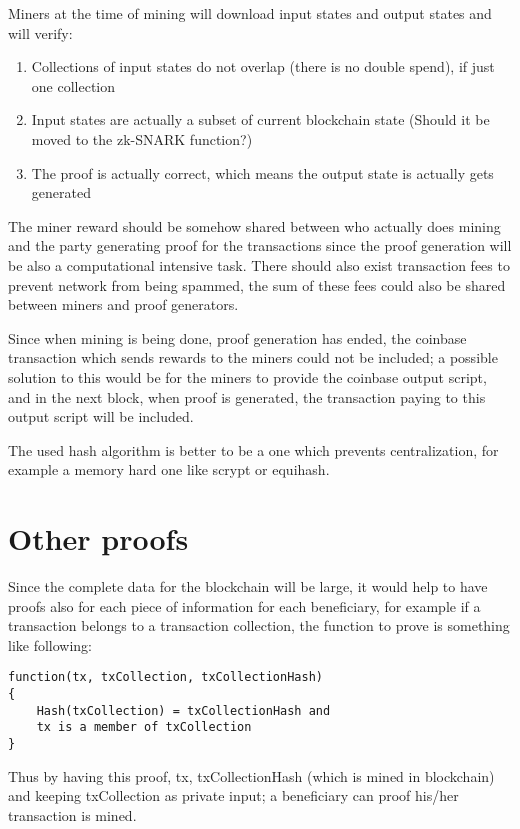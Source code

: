 \documentclass{article}
\begin{document}
Miners at the time of mining will download input states and output states and will verify:

\begin{enumerate}
\item Collections of input states do not overlap (there is no double spend), if just one collection 
\item Input states are actually a subset of current blockchain state (Should it be moved to the zk-SNARK function?)
\item The proof is actually correct, which means the output state is actually gets generated
\end{enumerate}

The miner reward should be somehow shared between who actually does mining and the party generating proof for the transactions since the proof generation will be also a computational intensive task.
There should also exist transaction fees to prevent network from being spammed, the sum of these fees could also be shared between miners and proof generators.

Since when mining is being done, proof generation has ended, the coinbase transaction which sends rewards to the miners could not be included; a possible solution to this would be for the miners to provide the coinbase output script, and in the next block, when proof is generated, the transaction paying to this output script will be included.

The used hash algorithm is better to be a one which prevents centralization, for example a memory hard one like scrypt or equihash.

\section{Other proofs}

Since the complete data for the blockchain will be large, it would help to have proofs also for each piece of information for each beneficiary, for example if a transaction belongs to a transaction collection, the function to prove is something like following:

\begin{verbatim}
function(tx, txCollection, txCollectionHash)
{
	Hash(txCollection) = txCollectionHash and
	tx is a member of txCollection 
}
\end{verbatim}

Thus by having this proof, tx, txCollectionHash (which is mined in blockchain) and keeping txCollection as private input; a beneficiary can proof his/her transaction is mined.
\end{document}
